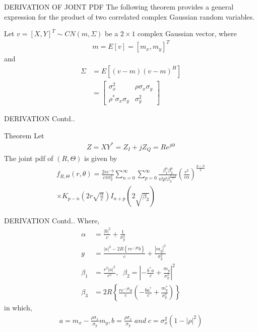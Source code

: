 \documentclass{beamer}
\providecommand{\sbrak}[1]{\ensuremath{{}\left[#1\right]}}
\providecommand{\brak}[1]{\ensuremath{\left(#1\right)}}
\providecommand{\cbrak}[1]{\ensuremath{\left\{#1\right\}}}
\begin{document}
\begin{frame}{DERIVATION OF JOINT PDF}
    The following theorem provides a general expression for the product of two correlated complex Gaussian random variables.
    
    Let $v=[X,Y]^T\sim CN\brak{m,\Sigma}$ be a $2\times 1$ complex Gaussian vector, where
    \begin{align}
        m=E[v]=[m_x,m_y]^T
    \end{align}
    and
    \begin{align}
        \Sigma&=E\sbrak{(v-m)(v-m)^H}\\&= 
        \begin{bmatrix}
        \sigma_x^2& \rho\sigma_x\sigma_y\\ 
        \rho^*\sigma_x\sigma_y & \sigma_y^2
        \end{bmatrix}
    \end{align}
\end{frame}
\begin{frame}{DERIVATION Contd..}
    \begin{block}{Theorem}
    Let
    \begin{align}
        Z=XY^*=Z_I+jZ_Q=Re^{j\Theta}
    \end{align}
    The joint pdf of $ \brak{R,\Theta}$ is given by
    \begin{multline}
        f_{R,\Theta}\brak{r,\theta}=\frac{2re^{-g}}{c\pi\sigma_y^2}\sum\limits_{n=0}^{\infty}\sum\limits_{p=0}^{\infty}\frac{\beta_1^n\beta_2^p}{n!p!\beta_3^{\frac{n+p}{2}}}\brak{\frac{r^2}{c\alpha}}^\frac{p-n}{2}\\\times K_{p-n}\brak{2r\sqrt{\frac{\alpha}{c}}}I_{n+p}\brak{2\sqrt{\beta_3}}\label{I100}
    \end{multline}
    \end{block}
\end{frame}
\begin{frame}{DERIVATION Contd..}
    Where,
    \begin{align}
        \alpha&=\frac{|b|^2}{c}+\frac{1}{\sigma_y^2}\\
        g&=\frac{|a|^2-2R\cbrak{re^{-j\theta}b}}{c}+\frac{|m_y|^2}{\sigma_y^2}\\
        \beta_1&=\frac{r^2|a|^2}{c^2},\;\;
        \beta_2=|-\frac{b^*a}{c}+\frac{m_y}{\sigma_y^2}|^2 \\
        \beta_3&=2R\cbrak{\frac{re^{-j\theta}a}{c}\brak{-\frac{ba^*}{c}+\frac{m_y^*}{\sigma_y^2}}}
        \end{align}
        in which,
        \begin{align}
            a=m_x-\frac{\rho\sigma_x}{\sigma_y}m_y,b=\frac{\rho\sigma_x}{\sigma_y}\;and\;
            c=\sigma_x^2(1-|\rho|^2)
        \end{align}
        
\end{frame}
\end{document}
